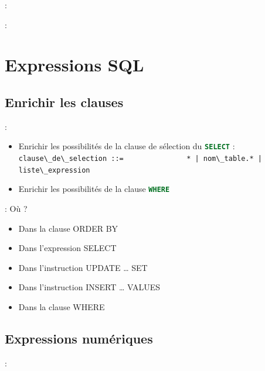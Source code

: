 \documentclass[10pt]{beamer}
\begin{document}
\begin{frame}{\secname : \subsecname}
    
\end{frame}

\begin{frame}{\secname : \subsecname}
    
\end{frame}
\section{Expressions SQL}
\tocss
\subsection{Enrichir les clauses}
\begin{frame}{\secname : \subsecname}
    \begin{itemize}
        \item Enrichir les possibilités de la clause de sélection du \lstinline[language=sql]!SELECT! : \lstinline[language=bnf]!clause\_de\_selection ::=
              * | nom\_table.* | liste\_expression!
        \item Enrichir les possibilités de la clause \lstinline[language=SQL]!WHERE!
    \end{itemize}
    
\end{frame}

\begin{frame}{\secname : \subsecname}
    Où ?
    \begin{itemize}
        \item Dans la clause ORDER BY
        \item Dans l'expression SELECT
        \item Dans l'instruction UPDATE … SET
        \item Dans l'instruction INSERT … VALUES
        \item Dans la clause WHERE
    \end{itemize}
\end{frame}
\subsection{Expressions numériques}
\begin{frame}{\secname : \subsecname}
    
\end{frame}
\end{document}

